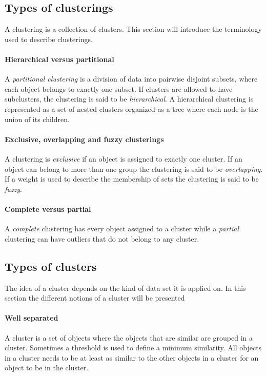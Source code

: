 \subsection{Types of clusterings}

A clustering is a collection of clusters.
This section will introduce the terminology used to describe clusterings. 

\paragraph{Hierarchical versus partitional}
A \textit{partitional clustering} is a division of data into pairwise disjoint subsets, where each object belongs to exactly one subset.
If clusters are allowed to have subclusters, the clustering is said to be \textit{hierarchical}.
A hierarchical clustering is represented as a set of nested clusters organized as a tree where each node is the union of its children.

\paragraph{Exclusive, overlapping and fuzzy clusterings}

A clustering is \textit{exclusive} if an object is assigned to exactly one cluster.
If an object can belong to more than one group the clustering is said to be \textit{overlapping}.
If a weight is used to describe the membership of sets the clustering is said to be \textit{fuzzy}.

\paragraph{Complete versus partial}

A \textit{complete} clustering has every object assigned to a cluster while a \textit{partial} clustering can have outliers that do not belong to any cluster.

\subsection{Types of clusters}
The idea of a cluster depends on the kind of data set it is applied on.
In this section the different notions of a cluster will be presented

\paragraph{Well separated}
A cluster is a set of objects where the objects that are similar are grouped in a cluster. 
Sometimes a threshold is used to define a minimum similarity. 
All objects in a cluster needs to be at least as similar to the other objects in a cluster for an object to be in the cluster.

